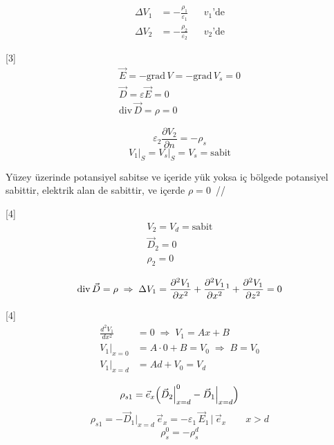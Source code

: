 \documentclass[11pt,a4paper]{article}
\begin{document}

\begin{align*}
\Delta V_1 &= -\frac{\rho_1}{\varepsilon_1} && v_1\text{'de} \\
\Delta V_2 &= -\frac{\rho_2}{\varepsilon_2} && v_2\text{'de}
\end{align*}

[3]
\begin{gather*}
\vec E = -\mathrm{grad}\,V = -\mathrm{grad}\,V_s = 0 \\
\vec D = \varepsilon\vec E = 0 \\
\mathrm{div}\,\vec D = \rho = 0
\end{gather*}

\[ \varepsilon_2\frac{\partial V_2}{\partial n} = -\rho_s \]
\[ V_1\big|_S = V_s\big|_S = V_s = \text{sabit} \]


Yüzey üzerinde potansiyel sabitse ve içeride yük yoksa iç bölgede potansiyel sabittir, elektrik alan de sabittir, ve içerde $\rho=0$ \,/\!/

[4]
\begin{gather*}
V_2 = V_d = \text{sabit} \\
\vec D_2 = 0 \\
\rho_2 = 0
\end{gather*}

\[ \mathrm{div}\,\vec D = \rho \;\Rightarrow\; \Delta V_1 = \frac{\partial^2 V_1}{\partial x^2} + \frac{\partial^2 V_1}{\partial x^2}\text{\footnotemark} + \frac{\partial^2 V_1}{\partial z^2} = 0 \]

[4]
\begin{align*}
\frac{d^2V_1}{dx^2} &= 0 \;\Rightarrow\; V_1 = Ax + B \\
V_1\Big|_{x=0} &= A\cdot 0 + B = V_0 \;\Rightarrow\; B = V_0 \\[2mm]
V_1\Big|_{x=d} &= Ad + V_0 = V_d
\end{align*}

\[ \rho_{s1} = \vec e_x\Bigl(\vec D_2\Big|^{0}_{x=d} - \vec D_1\Big|_{x=d}\Bigr) \]
\[ \rho_{s1} = -\vec D_1\Big|_{x=d}\,\vec e_x = -\varepsilon_1\,\vec E_1\,\Big|\,\vec e_x \qquad x>d \]
\[ \rho_s^{0} = -\rho_s^{d} \]
\end{document}
